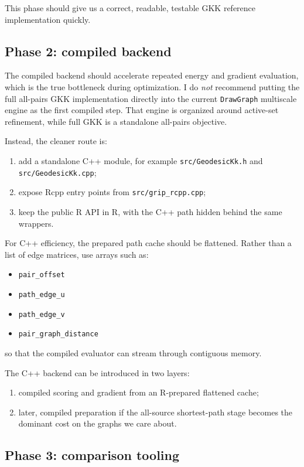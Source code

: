 \documentclass[11pt]{article}
\begin{document}
This phase should give us a correct, readable, testable GKK reference
implementation quickly.

\subsection{Phase 2: compiled backend}

The compiled backend should accelerate repeated energy and gradient evaluation,
which is the true bottleneck during optimization. I do \emph{not} recommend
putting the full all-pairs GKK implementation directly into the current
\texttt{DrawGraph} multiscale engine as the first compiled step. That engine is
organized around active-set refinement, while full GKK is a standalone
all-pairs objective.

Instead, the cleaner route is:
\begin{enumerate}[leftmargin=1.5em]
\item add a standalone C++ module, for example
\texttt{src/GeodesicKk.h} and \texttt{src/GeodesicKk.cpp};
\item expose Rcpp entry points from \texttt{src/grip\_rcpp.cpp};
\item keep the public R API in R, with the C++ path hidden behind the same
wrappers.
\end{enumerate}

For C++ efficiency, the prepared path cache should be flattened. Rather than a
list of edge matrices, use arrays such as:
\begin{itemize}[leftmargin=1.5em]
\item \texttt{pair\_offset}
\item \texttt{path\_edge\_u}
\item \texttt{path\_edge\_v}
\item \texttt{pair\_graph\_distance}
\end{itemize}
so that the compiled evaluator can stream through contiguous memory.

The C++ backend can be introduced in two layers:
\begin{enumerate}[leftmargin=1.5em]
\item compiled scoring and gradient from an R-prepared flattened cache;
\item later, compiled preparation if the all-source shortest-path stage becomes
the dominant cost on the graphs we care about.
\end{enumerate}

\subsection{Phase 3: comparison tooling}
\end{document}

